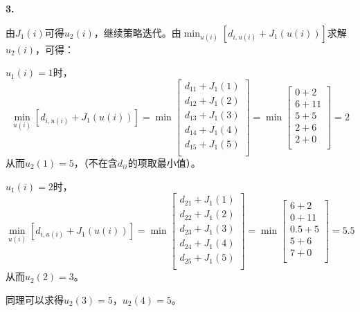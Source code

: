 \begin{example}
    \textbf{3.}

    由$J_1(i)$可得$u_2(i)$，继续策略迭代。由$\min_{u(i)}[d_{i,u(i)}+J_1(u(i))]$求解$u_2(i)$，可得：

    $u_1(i) = 1$时，
    \begin{equation}
        \min_{u(i)}[d_{i,u(i)}+J_1(u(i))] = \min \begin{bmatrix}
            d_{11}+J_1(1) \\
            d_{12}+J_1(2) \\
            d_{13}+J_1(3) \\
            d_{14}+J_1(4) \\
            d_{15}+J_1(5) \\
        \end{bmatrix} = \min \begin{bmatrix}
            0+2  \\
            6+11 \\
            5+5  \\
            2+6  \\
            2+0  \\
        \end{bmatrix} = 2
    \end{equation}
    从而$u_2(1)=5$，（不在含$d_{ii}$的项取最小值）。

    $u_1(i) = 2$时，
    \begin{equation}
        \min_{u(i)}[d_{i,u(i)}+J_1(u(i))] = \min \begin{bmatrix}
            d_{21}+J_1(1) \\
            d_{22}+J_1(2) \\
            d_{23}+J_1(3) \\
            d_{24}+J_1(4) \\
            d_{25}+J_1(5) \\
        \end{bmatrix} = \min \begin{bmatrix}
            6+2   \\
            0+11  \\
            0.5+5 \\
            5+6   \\
            7+0   \\
        \end{bmatrix} = 5.5
    \end{equation}
    从而$u_2(2)=3$。

    同理可以求得$u_2(3)=5$，$u_2(4)=5$。


\end{example}
